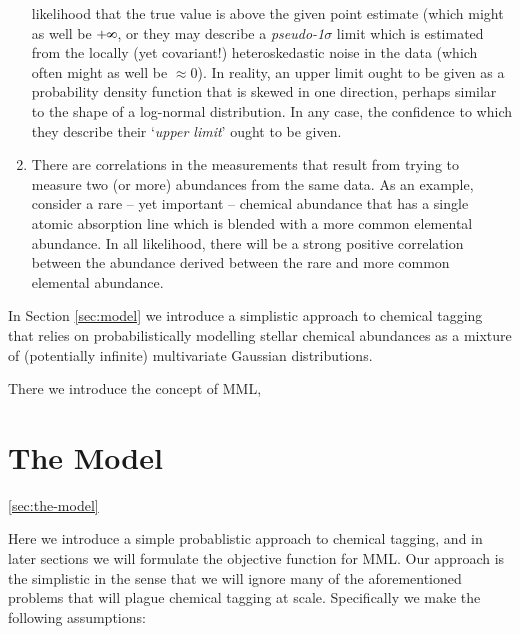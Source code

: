 \documentclass{aastex61}
\def\infinity{\rotatebox{90}{8}}
\begin{document}
\begin{enumerate}
{        likelihood that the true value is above the given point estimate (which might as well be $+\infinity$, or
        they may describe a \emph{pseudo-1$\sigma$} limit which is estimated
        from the locally (yet covariant!) heteroskedastic noise in the data (which often might as well be $\approx$0).
        In reality, an upper limit ought to be given as a probability density
        function that is skewed in one direction, perhaps similar to the shape
        of a log-normal distribution. In any case, the confidence to which they
        describe their `\emph{upper limit}' ought to be given.}
\item There are correlations in the measurements that result from trying to
      measure two (or more) abundances from the same data. As an example,
      consider a rare -- yet important -- chemical abundance that has a single
      atomic absorption line which is blended with a more common elemental
      abundance. In all likelihood, there will be a strong positive correlation
      between the abundance derived between the rare and more common elemental
      abundance.
\end{enumerate}






In Section \ref{sec:model} we introduce a simplistic approach to chemical
tagging that relies on probabilistically modelling stellar chemical abundances
as a mixture of (potentially infinite) multivariate Gaussian distributions.

There we introduce the concept of MML,


\section{The Model}
\ref{sec:the-model}

Here we introduce a simple probablistic approach to chemical tagging, and in
later sections we will formulate the objective function for MML. Our approach is
the simplistic in the sense that we will ignore many of the aforementioned
problems that will plague chemical tagging at scale. Specifically we make the
following assumptions:
\end{document}
